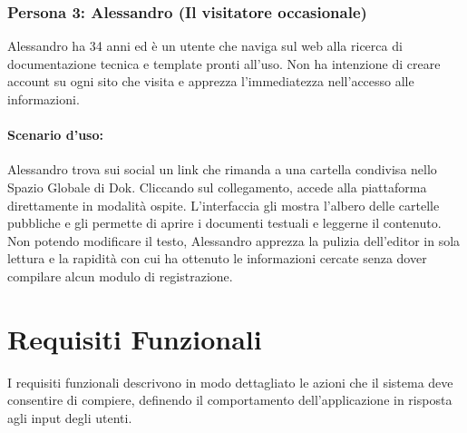 \documentclass[11pt,a4paper]{report}
\begin{document}
\subsubsection{Persona 3: Alessandro (Il visitatore occasionale)}
Alessandro ha 34 anni ed è un utente che naviga sul web alla ricerca di documentazione tecnica e template pronti all'uso. Non ha intenzione di creare account su ogni sito che visita e apprezza l'immediatezza nell'accesso alle informazioni.

\paragraph{Scenario d'uso:} Alessandro trova sui social un link che rimanda a una cartella condivisa nello Spazio Globale di Dok. Cliccando sul collegamento, accede alla piattaforma direttamente in modalità ospite. L'interfaccia gli mostra l'albero delle cartelle pubbliche e gli permette di aprire i documenti testuali e leggerne il contenuto. Non potendo modificare il testo, Alessandro apprezza la pulizia dell'editor in sola lettura e la rapidità con cui ha ottenuto le informazioni cercate senza dover compilare alcun modulo di registrazione.

\section{Requisiti Funzionali}
I requisiti funzionali descrivono in modo dettagliato le azioni che il sistema deve consentire di compiere, definendo il comportamento dell'applicazione in risposta agli input degli utenti.
\end{document}
